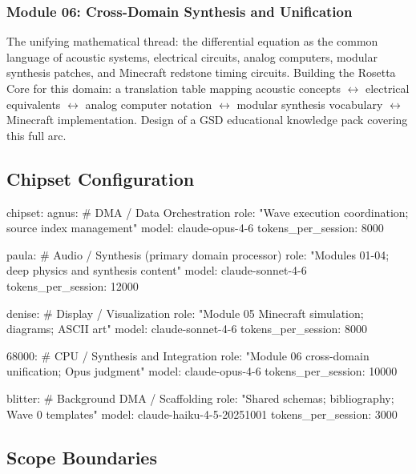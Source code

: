 \documentclass[11pt,letterpaper]{article}
\begin{document}
\subsubsection{Module 06: Cross-Domain Synthesis and Unification}

The unifying mathematical thread: the differential equation as the common language of acoustic systems, electrical circuits, analog computers, modular synthesis patches, and Minecraft redstone timing circuits. Building the Rosetta Core for this domain: a translation table mapping acoustic concepts $\leftrightarrow$ electrical equivalents $\leftrightarrow$ analog computer notation $\leftrightarrow$ modular synthesis vocabulary $\leftrightarrow$ Minecraft implementation. Design of a GSD educational knowledge pack covering this full arc.

\subsection{Chipset Configuration}

\begin{asciibox}
chipset:
  agnus:   # DMA / Data Orchestration
    role: "Wave execution coordination; source index management"
    model: claude-opus-4-6
    tokens_per_session: 8000

  paula:   # Audio / Synthesis (primary domain processor)
    role: "Modules 01-04; deep physics and synthesis content"
    model: claude-sonnet-4-6
    tokens_per_session: 12000

  denise:  # Display / Visualization
    role: "Module 05 Minecraft simulation; diagrams; ASCII art"
    model: claude-sonnet-4-6
    tokens_per_session: 8000

  68000:   # CPU / Synthesis and Integration
    role: "Module 06 cross-domain unification; Opus judgment"
    model: claude-opus-4-6
    tokens_per_session: 10000

  blitter: # Background DMA / Scaffolding
    role: "Shared schemas; bibliography; Wave 0 templates"
    model: claude-haiku-4-5-20251001
    tokens_per_session: 3000
\end{asciibox}

\subsection{Scope Boundaries}
\end{document}
